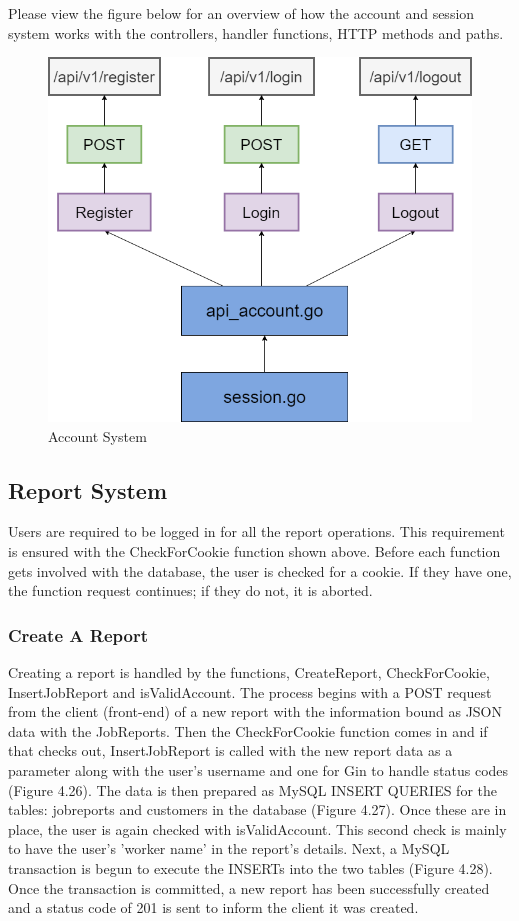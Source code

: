 Please view the figure below for an overview of how the account and session system works with the controllers, handler functions, HTTP methods and paths.
\begin{figure}[H]
    \caption{Account System}
    \label{image:accountSystem}
    \centering
    \includegraphics[width=1.0\textwidth]{images/horton/account_system/account_system.png}
\end{figure}

\subsection{Report System}
Users are required to be logged in for all the report operations. This requirement is ensured with the CheckForCookie function shown above. Before each function gets involved with the database, the user is checked for a cookie. If they have one, the function request continues; if they do not, it is aborted.

\subsubsection{Create A Report}
Creating a report is handled by the functions, CreateReport, CheckForCookie, InsertJobReport
and isValidAccount. The process begins with a POST request from the client (front-end) of a new report with the information bound as JSON data with the JobReports. Then the CheckForCookie function comes in and if that checks out, InsertJobReport is called with the new report data as a parameter along with the user's username and one for Gin to handle status codes (Figure 4.26). The data is then prepared as MySQL INSERT QUERIES for the tables: jobreports and customers in the database (Figure 4.27). Once these are in place, the user is again checked with isValidAccount. This second check is mainly to have the user's 'worker name' in the report's details. Next, a MySQL transaction is begun to execute the INSERTs into the two tables (Figure 4.28). Once the transaction is committed, a new report has been successfully created and a status code of 201 is sent to inform the client it was created. 

